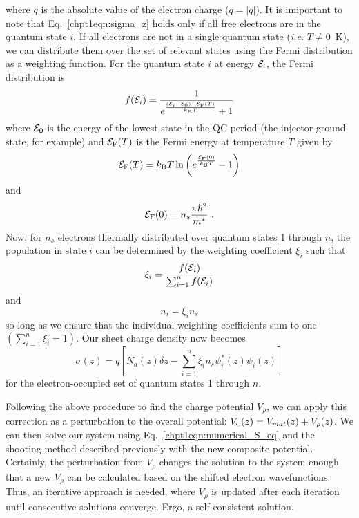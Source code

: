 {\begin{equation}
\end{equation}
where $q$ is the absolute value of the electron charge ($q=|q|$). It is imiportant to note that Eq.~\eqref{chpt1eqn:sigma_z} holds only if all free electrons are in the quantum state $i$.  If all electrons are not in a single quantum state (\emph{i.e.} $T\neq0$~K), we can distribute them over the set of relevant states using the Fermi distribution as a weighting function.  For the quantum state $i$ at energy $\EE_i$, the Fermi distribution is
\begin{equation}
f(\EE_i) = \frac{1}{e^{\frac{(\EE_i-\EE_0)-\EE_\tn{F}(T)}{k_\tn{B} T}}+1}
\end{equation}
where $\EE_0$ is the energy of the lowest state in the QC period (the injector ground state, for example) and $\EE_\tn{F}(T)$ is the Fermi energy at temperature $T$ given by \cite{Davies:book:1998}
\begin{equation}
\EE_\tn{F}(T)=k_\tn{B} T \ln\left(e^{\frac{\EE_\tn{F}(0)}{k_\tn{B} T}}-1\right)
\end{equation}
and
\begin{equation}
\EE_\tn{F}(0)=n_s \frac{\pi \hslash^2}{m^*} \text{~.}
\end{equation}
Now, for $n_s$ electrons thermally distributed over quantum states 1 through $n$, the population in state $i$ can be determined by the weighting coefficient $\xi_i$ such that
\begin{equation}
\xi_i = \frac{f(\EE_i)}{\sum_{i=1}^{n} f(\EE_i)}
\end{equation}
and
\begin{equation}
n_i=\xi_i n_s
\end{equation}
so long as we ensure that the individual weighting coefficients sum to one $\left(\sum_{i=1}^{n} \xi_i = 1\right)$.
Our sheet charge density now becomes
\begin{equation}
\sigma(z) = q \left[N_d(z) \delta\!z - \sum_{i=1}^{n} \xi_i n_s \psi_i^*(z) \psi_i(z) \right]
\end{equation}
for the electron-occupied set of quantum states 1 through $n$.

Following the above procedure to find the charge potential $V_\rho$, we can apply this correction as a perturbation to the overall potential: $V_{\textnormal{\tiny{C}}}(z)=V_{mat}(z)+V_\rho(z)$.  We can then solve our system using Eq.~\eqref{chpt1eqn:numerical_S_eq} and the shooting method described previously with the new composite potential.  Certainly, the perturbation from $V_\rho$ changes the solution to the system enough that a new $V_\rho$ can be calculated based on the shifted electron wavefunctions.  Thus, an iterative approach is needed, where $V_\rho$ is updated after each iteration until consecutive solutions converge.  Ergo, a self-consistent solution.

}
